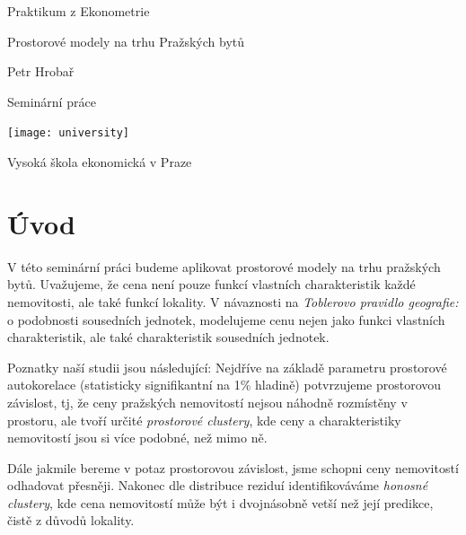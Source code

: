 \documentclass[11pt, a4paper]{article}
\begin{document}
\begin{titlepage}
    \begin{center}
        \vspace*{1cm}
            
        \Huge
        Praktikum z Ekonometrie
            
        \vspace{0.5cm}
        \LARGE
        Prostorové modely na trhu Pražských bytů
            
        \vspace{2.5cm}
            
        Petr Hrobař
            
        \vfill
            
        Seminární práce
            
        \vspace{0.8cm}
            
        \texttt{[image: university]}
            
        \Large
        Vysoká škola ekonomická v Praze\\
            
    \end{center}
\end{titlepage}


\clearpage

\tableofcontents


\clearpage
\section{Úvod}

V této seminární práci budeme aplikovat prostorové modely na trhu pražských bytů. Uvažujeme, že cena není pouze funkcí vlastních charakteristik každé nemovitosti, ale také funkcí lokality. V návaznosti na \textit{Toblerovo pravidlo geografie:} o podobnosti sousedních jednotek, modelujeme cenu nejen jako funkci vlastních charakteristik, ale také charakteristik sousedních jednotek. 

Poznatky naší studii jsou následující: Nejdříve na základě parametru prostorové autokorelace (statisticky signifikantní na 1\% hladině) potvrzujeme prostorovou závislost, tj, že ceny pražských nemovitostí nejsou náhodně rozmístěny v prostoru, ale tvoří určité \textit{prostorové clustery}, kde ceny a charakteristiky nemovitostí jsou si více podobné, než mimo ně. 

Dále jakmile bereme v potaz prostorovou závislost, jsme schopni ceny nemovitostí odhadovat přesněji. Nakonec dle distribuce reziduí identifikováváme \textit{honosné clustery}, kde cena nemovitostí může být i dvojnásobně vetší než její predikce, čistě z důvodů lokality.
\end{document}
